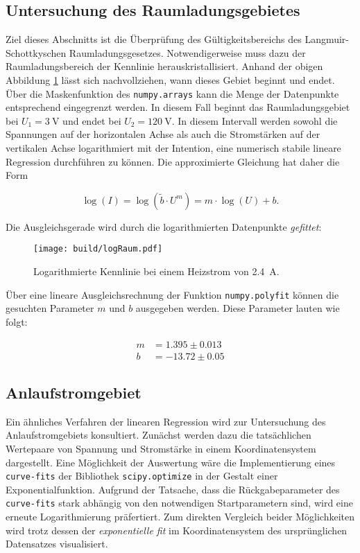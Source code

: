 \subsection{Untersuchung des Raumladungsgebietes}
\label{sec:Raumladungsgebiet}

Ziel dieses Abschnitts ist die Überprüfung des Gültigkeitsbereichs des Langmuir-Schottkyschen Raumladungsgesetzes. Notwendigerweise muss dazu der Raumladungsbereich 
der Kennlinie herauskristallisiert. Anhand der obigen Abbildung \ref{fig:Kennlinien2} lässt sich nachvollziehen, wann dieses Gebiet beginnt und endet. Über die 
Maskenfunktion des \texttt{numpy.arrays} kann die Menge der Datenpunkte entsprechend eingegrenzt werden. In diesem Fall beginnt das Raumladungsgebiet bei $U_1 = \qty{3}{\volt}$
und endet bei $U_2 = \qty{120}{\volt}$. In diesem Intervall werden sowohl die Spannungen auf der horizontalen Achse als auch die Stromstärken auf der vertikalen Achse 
logarithmiert mit der Intention, eine numerisch stabile lineare Regression durchführen zu können. Die approximierte Gleichung hat daher die Form

\begin{equation*}
    \log(I) = \log(\tilde{b}\cdot{}U^m) = m\cdot\log(U) + b.
\end{equation*}

\noindent Die Ausgleichsgerade wird durch die logarithmierten Datenpunkte \emph{gefittet}: 

\begin{figure}[H]
    \centering 
    \texttt{[image: build/logRaum.pdf]}
    \caption{Logarithmierte Kennlinie bei einem Heizstrom von \qty{2.4}{\ampere}.}
    \label{fig:Kennlinien2}
\end{figure}

\noindent Über eine lineare Ausgleichsrechnung der Funktion \texttt{numpy.polyfit} können die gesuchten Parameter $m$ und $b$ ausgegeben werden.
Diese Parameter lauten wie folgt:

\begin{align*}
    m &= 1.395\pm0.013\\
    b &= -13.72\pm0.05
\end{align*}

\subsection{Anlaufstromgebiet}
\label{sec:AnlaufstromgebietSec}


Ein ähnliches Verfahren der linearen Regression wird zur Untersuchung des Anlaufstromgebiets konsultiert. Zunächst werden dazu die tatsächlichen Wertepaare von 
Spannung und Stromstärke in einem Koordinatensystem dargestellt. Eine Möglichkeit der Auswertung wäre die Implementierung eines \texttt{curve-fits} der 
Bibliothek \texttt{scipy.optimize} in der Gestalt einer Exponentialfunktion. Aufgrund der Tatsache, dass die Rückgabeparameter des \texttt{curve-fits} stark 
abhängig von den notwendigen Startparametern sind, wird eine erneute Logarithmierung präfertiert. Zum direkten Vergleich beider Möglichkeiten wird trotz dessen 
der \emph{exponentielle fit} im Koordinatensystem des ursprünglichen Datensatzes visualisiert.

